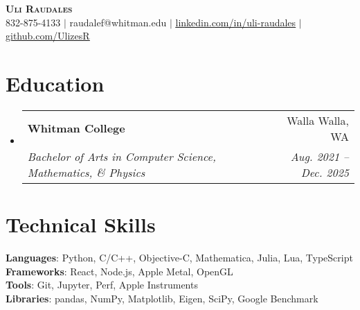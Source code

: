 \documentclass[letterpaper,11pt]{article}
\makeatletter
\newcommand{\resumeSubheading}[4]{
  \vspace{-2pt}\item
    \begin{tabular*}{0.97\textwidth}[t]{l@{\extracolsep{\fill}}r}
      \textbf{#1} & #2 \\
      \textit{\small#3} & \textit{\small #4} \\
    \end{tabular*}\vspace{-7pt}
}
\newcommand{\resumeSubHeadingListStart}{\begin{itemize}[leftmargin=0.15in, label={}]}
\newcommand{\resumeSubHeadingListEnd}{\end{itemize}}
\makeatother
\begin{document}
\begin{center}
    \textbf{\Huge \scshape Uli Raudales} \\ \vspace{1pt}
    \small 832-875-4133 $|$ raudalef@whitman.edu $|$ 
    \href{https://linkedin.com/in/uli-raudales-3120b629a/}{\underline{linkedin.com/in/uli-raudales}} $|$
    \href{https://github.com/UlizesR}{\underline{github.com/UlizesR}}
\end{center}

\section{Education}
  \resumeSubHeadingListStart
    \resumeSubheading
      {Whitman College}{Walla Walla, WA}
      {Bachelor of Arts in Computer Science, Mathematics, \& Physics}{Aug. 2021 -- Dec. 2025}
  \resumeSubHeadingListEnd

\section{Technical Skills}
 \begin{itemize}[leftmargin=0.15in, label={}]
    \small{\item{
     \textbf{Languages}{: Python, C/C++, Objective-C, Mathematica, Julia, Lua, TypeScript} \\
     \textbf{Frameworks}{: React, Node.js, Apple Metal, OpenGL} \\
     \textbf{Tools}{: Git, Jupyter, Perf, Apple Instruments} \\
     \textbf{Libraries}{: pandas, NumPy, Matplotlib, Eigen, SciPy, Google Benchmark} \\
    }}
 \end{itemize}


\end{document}
